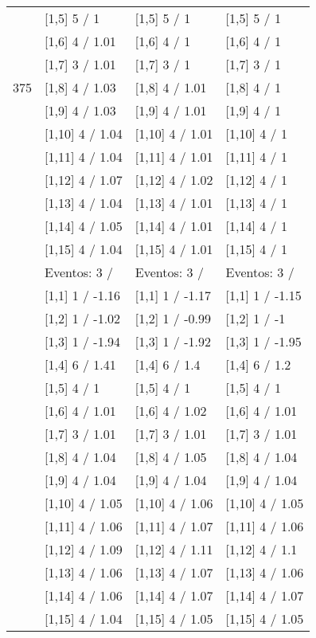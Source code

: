 \begin{table}
\begin{tabular}[t]{llll}
 & {}[1,5] 5  / 1 & {}[1,5] 5  / 1 & {}[1,5] 5  / 1\\
 & {}[1,6] 4  / 1.01 & {}[1,6] 4  / 1 & {}[1,6] 4  / 1\\
 & {}[1,7] 3  / 1.01 & {}[1,7] 3  / 1 & {}[1,7] 3  / 1\\
375 & {}[1,8] 4  / 1.03 & {}[1,8] 4  / 1.01 & {}[1,8] 4  / 1\\
\addlinespace
 & {}[1,9] 4  / 1.03 & {}[1,9] 4  / 1.01 & {}[1,9] 4  / 1\\
 & {}[1,10] 4  / 1.04 & {}[1,10] 4  / 1.01 & {}[1,10] 4  / 1\\
 & {}[1,11] 4  / 1.04 & {}[1,11] 4  / 1.01 & {}[1,11] 4  / 1\\
 & {}[1,12] 4  / 1.07 & {}[1,12] 4  / 1.02 & {}[1,12] 4  / 1\\
 & {}[1,13] 4  / 1.04 & {}[1,13] 4  / 1.01 & {}[1,13] 4  / 1\\
\addlinespace
 & {}[1,14] 4  / 1.05 & {}[1,14] 4  / 1.01 & {}[1,14] 4  / 1\\
 & {}[1,15] 4  / 1.04 & {}[1,15] 4  / 1.01 & {}[1,15] 4  / 1\\
 & Eventos:  3 / & Eventos:  3 / & Eventos:  3 /\\
 & {}[1,1] 1  / -1.16 & {}[1,1] 1  / -1.17 & {}[1,1] 1  / -1.15\\
 & {}[1,2] 1  / -1.02 & {}[1,2] 1  / -0.99 & {}[1,2] 1  / -1\\
\addlinespace
 & {}[1,3] 1  / -1.94 & {}[1,3] 1  / -1.92 & {}[1,3] 1  / -1.95\\
 & {}[1,4] 6  / 1.41 & {}[1,4] 6  / 1.4 & {}[1,4] 6  / 1.2\\
 & {}[1,5] 4  / 1 & {}[1,5] 4  / 1 & {}[1,5] 4  / 1\\
 & {}[1,6] 4  / 1.01 & {}[1,6] 4  / 1.02 & {}[1,6] 4  / 1.01\\
 & {}[1,7] 3  / 1.01 & {}[1,7] 3  / 1.01 & {}[1,7] 3  / 1.01\\
\addlinespace
500 & {}[1,8] 4  / 1.04 & {}[1,8] 4  / 1.05 & {}[1,8] 4  / 1.04\\
 & {}[1,9] 4  / 1.04 & {}[1,9] 4  / 1.04 & {}[1,9] 4  / 1.04\\
 & {}[1,10] 4  / 1.05 & {}[1,10] 4  / 1.06 & {}[1,10] 4  / 1.05\\
 & {}[1,11] 4  / 1.06 & {}[1,11] 4  / 1.07 & {}[1,11] 4  / 1.06\\
 & {}[1,12] 4  / 1.09 & {}[1,12] 4  / 1.11 & {}[1,12] 4  / 1.1\\
\addlinespace
 & {}[1,13] 4  / 1.06 & {}[1,13] 4  / 1.07 & {}[1,13] 4  / 1.06\\
 & {}[1,14] 4  / 1.06 & {}[1,14] 4  / 1.07 & {}[1,14] 4  / 1.07\\
 & {}[1,15] 4  / 1.04 & {}[1,15] 4  / 1.05 & {}[1,15] 4  / 1.05\\
\bottomrule
\end{tabular}
\end{table}

